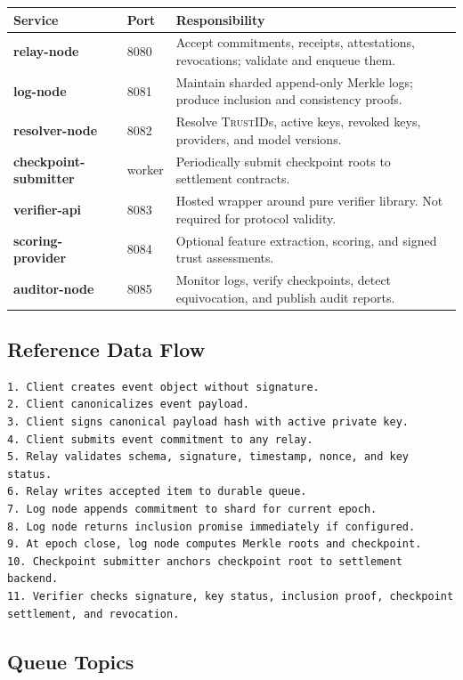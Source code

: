 \documentclass[11pt]{article}
\newcommand{\TrustID}{\textsc{TrustID}}
\begin{document}
\begin{center}
\begin{tabularx}{\textwidth}{>{\bfseries}p{} p{} X}
\toprule
Service & Port & Responsibility \\
\midrule
relay-node & 8080 & Accept commitments, receipts, attestations, revocations; validate and enqueue them. \\
log-node & 8081 & Maintain sharded append-only Merkle logs; produce inclusion and consistency proofs. \\
resolver-node & 8082 & Resolve \TrustID{}s, active keys, revoked keys, providers, and model versions. \\
checkpoint-submitter & worker & Periodically submit checkpoint roots to settlement contracts. \\
verifier-api & 8083 & Hosted wrapper around pure verifier library. Not required for protocol validity. \\
scoring-provider & 8084 & Optional feature extraction, scoring, and signed trust assessments. \\
auditor-node & 8085 & Monitor logs, verify checkpoints, detect equivocation, and publish audit reports. \\
\bottomrule
\end{tabularx}
\end{center}

\subsection{Reference Data Flow}

\begin{lstlisting}[style=tslcode]
1. Client creates event object without signature.
2. Client canonicalizes event payload.
3. Client signs canonical payload hash with active private key.
4. Client submits event commitment to any relay.
5. Relay validates schema, signature, timestamp, nonce, and key status.
6. Relay writes accepted item to durable queue.
7. Log node appends commitment to shard for current epoch.
8. Log node returns inclusion promise immediately if configured.
9. At epoch close, log node computes Merkle roots and checkpoint.
10. Checkpoint submitter anchors checkpoint root to settlement backend.
11. Verifier checks signature, key status, inclusion proof, checkpoint settlement, and revocation.
\end{lstlisting}

\subsection{Queue Topics}
\end{document}
